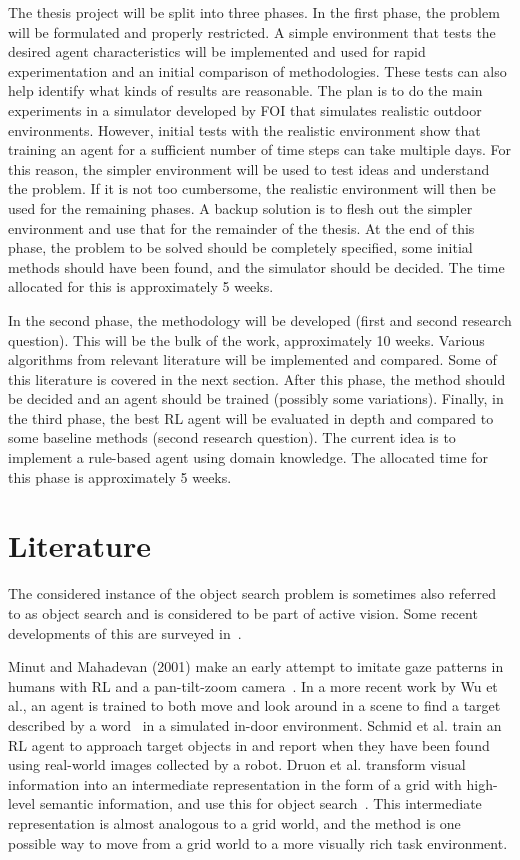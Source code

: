 \documentclass{article}
\begin{document}
The thesis project will be split into three phases. In the first phase, the problem will be formulated and properly restricted. A simple environment that tests the desired agent characteristics will be implemented and used for rapid experimentation and an initial comparison of methodologies. These tests can also help identify what kinds of results are reasonable. The plan is to do the main experiments in a simulator developed by FOI that simulates realistic outdoor environments. However, initial tests with the realistic environment show that training an agent for a sufficient number of time steps can take multiple days. For this reason, the simpler environment will be used to test ideas and understand the problem. If it is not too cumbersome, the realistic environment will then be used for the remaining phases. A backup solution is to flesh out the simpler environment and use that for the remainder of the thesis. At the end of this phase, the problem to be solved should be completely specified, some initial methods should have been found, and the simulator should be decided. The time allocated for this is approximately 5 weeks.

In the second phase, the methodology will be developed (first and second research question). This will be the bulk of the work, approximately 10 weeks. Various algorithms from relevant literature will be implemented and compared. Some of this literature is covered in the next section. After this phase, the method should be decided and an agent should be trained (possibly some variations). Finally, in the third phase, the best RL agent will be evaluated in depth and compared to some baseline methods (second research question). The current idea is to implement a rule-based agent using domain knowledge. The allocated time for this phase is approximately 5 weeks.

\section{Literature}

The considered instance of the object search problem is sometimes also referred to as object search and is considered to be part of active vision. Some recent developments of this are surveyed in~\cite{chen2011}.

Minut and Mahadevan (2001) make an early attempt to imitate gaze patterns in humans with RL and a pan-tilt-zoom camera~\cite{minut2001}. In a more recent work by Wu et al., an agent is trained to both move and look around in a scene to find a target described by a word~\cite{wu2020} in a simulated in-door environment. Schmid et al. train an RL agent to approach target objects in and report when they have been found using real-world images collected by a robot. Druon et al. transform visual information into an intermediate representation in the form of a grid with high-level semantic information, and use this for object search~\cite{druon2020}. This intermediate representation is almost analogous to a grid world, and the method is one possible way to move from a grid world to a more visually rich task environment. 
\end{document}
